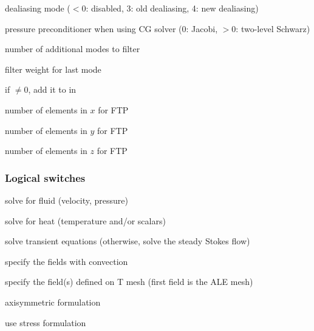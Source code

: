 \documentclass[letterpaper,10pt,english]{sphinxmanual}
\begin{document}
\begin{DUlineblock}{0em}
\item[] 
\item[]  dealiasing mode (\(<0\): disabled, 3: old dealiasing, 4: new dealiasing)
\item[] 
\item[]   pressure preconditioner when using CG solver (0: Jacobi, \(>0\): two-level Schwarz) 
\item[] 
\item[]  number of additional modes to filter
\item[] 
\item[]  filter weight for last mode
\item[] 
\item[]  if \(\neq0\), add it to  in 
\item[] 
\item[]  number of elements in \(x\) for FTP
\item[] 
\item[]  number of elements in \(y\) for FTP
\item[] 
\item[]  number of elements in \(z\) for FTP
\item[] 
\end{DUlineblock}


\subsubsection{Logical switches}
\label{\detokenize{appendix:logical-switches}}\label{\detokenize{appendix:sec-switches}}
 solve for fluid (velocity, pressure)

 solve for heat (temperature and/or scalars)

 solve transient equations (otherwise, solve the steady Stokes flow)

 specify the fields with convection

 specify the field(s) defined on T mesh  (first field is the ALE mesh)

 axisymmetric formulation

 use stress formulation
\end{document}
